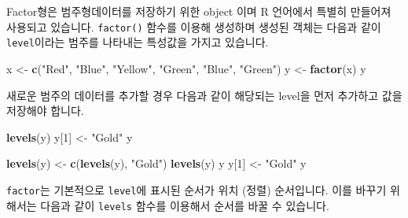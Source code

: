 \documentclass[
]{book}
\newenvironment{Shaded}{\begin{snugshade}}{\end{snugshade}}
\newcommand{\CommentTok}[1]{\textcolor[rgb]{0.56,0.35,0.01}{\textit{#1}}}
\newcommand{\DecValTok}[1]{\textcolor[rgb]{0.00,0.00,0.81}{#1}}
\newcommand{\KeywordTok}[1]{\textcolor[rgb]{0.13,0.29,0.53}{\textbf{#1}}}
\newcommand{\NormalTok}[1]{#1}
\newcommand{\OperatorTok}[1]{\textcolor[rgb]{0.81,0.36,0.00}{\textbf{#1}}}
\newcommand{\StringTok}[1]{\textcolor[rgb]{0.31,0.60,0.02}{#1}}
\begin{document}
Factor형은 범주형데이터를 저장하기 위한 object 이며 R 언어에서 특별히 만들어져 사용되고 있습니다. \texttt{factor()} 함수를 이용해 생성하며 생성된 객체는 다음과 같이 \texttt{level}이라는 범주를 나타내는 특성값을 가지고 있습니다.

\begin{Shaded}
\begin{Highlighting}[]
\NormalTok{x <{-}}\StringTok{ }\KeywordTok{c}\NormalTok{(}\StringTok{"Red"}\NormalTok{, }\StringTok{"Blue"}\NormalTok{, }\StringTok{"Yellow"}\NormalTok{, }\StringTok{"Green"}\NormalTok{, }\StringTok{"Blue"}\NormalTok{, }\StringTok{"Green"}\NormalTok{)}
\NormalTok{y <{-}}\StringTok{ }\KeywordTok{factor}\NormalTok{(x)}
\NormalTok{y}
\end{Highlighting}
\end{Shaded}

새로운 범주의 데이터를 추가할 경우 다음과 같이 해당되는 level을 먼저 추가하고 값을 저장해야 합니다.

\begin{Shaded}
\begin{Highlighting}[]
\KeywordTok{levels}\NormalTok{(y)}
\NormalTok{y[}\DecValTok{1}\NormalTok{] <{-}}\StringTok{ "Gold"}
\NormalTok{y}

\KeywordTok{levels}\NormalTok{(y) <{-}}\StringTok{ }\KeywordTok{c}\NormalTok{(}\KeywordTok{levels}\NormalTok{(y), }\StringTok{"Gold"}\NormalTok{)}
\KeywordTok{levels}\NormalTok{(y)}
\NormalTok{y}
\NormalTok{y[}\DecValTok{1}\NormalTok{] <{-}}\StringTok{ "Gold"}
\NormalTok{y}
\end{Highlighting}
\end{Shaded}

\texttt{factor}는 기본적으로 \texttt{level}에 표시된 순서가 위치 (정렬) 순서입니다. 이를 바꾸기 위해서는 다음과 같이 \texttt{levels} 함수를 이용해서 순서를 바꿀 수 있습니다.

\begin{Shaded}
\end{Shaded}
\end{document}
